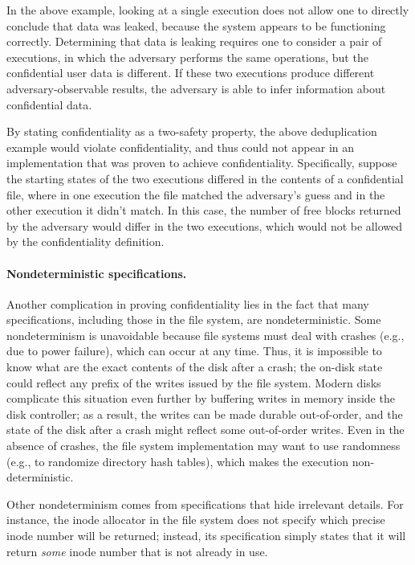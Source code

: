 In the above example, looking at a single execution does not allow one
to directly conclude that data was leaked, because the system appears
to be functioning correctly.  Determining that data is leaking requires
one to consider a pair of executions, in which the adversary performs
the same operations, but the confidential user data is different.
If these two executions produce different adversary-observable results,
the adversary is able to infer information about confidential data.

By stating confidentiality as a two-safety property, the above
deduplication example would violate confidentiality, and thus could not
appear in an implementation that was proven to achieve confidentiality.
Specifically, suppose the starting states of the two executions differed
in the contents of a confidential file, where in one execution the file
matched the adversary's guess and in the other execution it didn't match.
In this case, the number of free blocks returned by the adversary
would differ in the two executions, which would not be allowed by the
confidentiality definition.

\paragraph{Nondeterministic specifications.}
Another complication in proving confidentiality lies in the fact
that many specifications, including those in the file system, are
nondeterministic.  Some nondeterminism is unavoidable because file
systems must deal with crashes (e.g., due to power failure), which can
occur at any time.  Thus, it is impossible to
know what are the exact contents of the disk after a crash; the on-disk
state could reflect any prefix of the writes issued by the file system.
Modern disks complicate this situation even further by buffering writes
in memory inside the disk controller; as a result, the writes can be
made durable out-of-order, and the state of the disk after a crash might
reflect some out-of-order writes.  Even in the absence of crashes, the
file system implementation may want to use randomness (e.g., to randomize
directory hash tables), which makes the execution non-deterministic.

Other nondeterminism comes from specifications that hide irrelevant
details.  For instance, the inode allocator in the file system does
not specify which precise inode number will be returned; instead,
its specification simply states that it will return
\emph{some} inode number that is not already in use.

